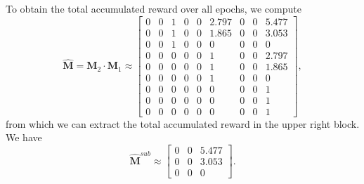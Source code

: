 \documentclass[hidelinks,11pt]{article}
\begin{document}
    To obtain the total accumulated reward over all epochs, we compute
    \begin{equation}
        \label{eq:prod_moments_example}
        \hat{\mathbf{M}} = \mathbf{M}_2 \cdot \mathbf{M}_1 \approx
        \left [
            \begin{array}{ccc|ccc|ccc}
                0 & 0 & 1 & 0 & 0 & 2.797 & 0 & 0 & 5.477 \\
                0 & 0 & 1 & 0 & 0 & 1.865 & 0 & 0 & 3.053 \\
                0 & 0 & 1 & 0 & 0 & 0     & 0 & 0 & 0     \\
                \hline
                0 & 0 & 0 & 0 & 0 & 1     & 0 & 0 & 2.797 \\
                0 & 0 & 0 & 0 & 0 & 1     & 0 & 0 & 1.865 \\
                0 & 0 & 0 & 0 & 0 & 1     & 0 & 0 & 0     \\
                \hline
                0 & 0 & 0 & 0 & 0 & 0     & 0 & 0 & 1     \\
                0 & 0 & 0 & 0 & 0 & 0     & 0 & 0 & 1     \\
                0 & 0 & 0 & 0 & 0 & 0     & 0 & 0 & 1
            \end{array}
            \right ],
    \end{equation}
    from which we can extract the total accumulated reward in the upper right block.
    We have
    \begin{equation*}
        \hat{\mathbf{M}}^{sub} \approx \left [
            \begin{array}{ccc}
                0 & 0 & 5.477 \\
                0 & 0 & 3.053 \\
                0 & 0 & 0
            \end{array}
            \right ].
    \end{equation*}
\end{document}
